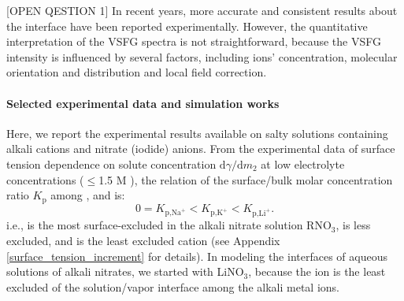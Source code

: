 [OPEN QESTION 1]
In recent years, more accurate and consistent results about the interface have been reported experimentally\cite{TianCS2009,Shen2013}. 
However, the quantitative interpretation of the VSFG spectra is not straightforward, because the VSFG intensity is influenced by several factors, including ions' concentration, 
molecular orientation and distribution and local field correction\cite{Morita2008}.

\paragraph{Selected experimental data and simulation works}
Here, we report the experimental results available on salty solutions containing alkali cations and nitrate (iodide) anions\cite{PS03,AJ12,HuaWei2014}. 
From the experimental data of surface tension dependence on solute concentration $\text{d}\gamma/\text{d}m_2$ 
at low electrolyte concentrations ($\leq$1.5 M )\cite{Weissenborn95,Hey81,Jarvis68,Jarvis72}, 
the relation of the surface/bulk molar concentration ratio $K_{\text{p}}$\cite{Pegram2006} among \li, \Na and \K is: 
\begin{equation}
0=K_{\text{p,Na}^+}< K_{\text{p,K}^+}< K_{\text{p,Li}^+}.\nonumber
\label{eq:bscr}
\end{equation}
i.e., \Na is the most surface-excluded in the alkali nitrate solution RNO$_3$, \K is less excluded, 
and \Li is the least excluded cation (see Appendix \ref{surface_tension_increment} for details).
In modeling the interfaces of aqueous solutions of alkali nitrates, we started with LiNO$_3$, 
because the \Li ion is the least excluded of the solution/vapor interface among the alkali metal ions. 

